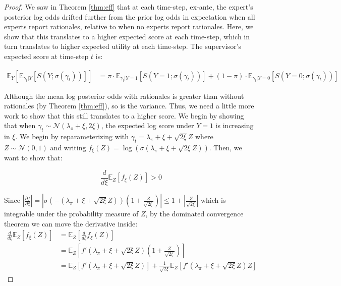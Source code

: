 \documentclass{winnower}
\begin{document}
\begin{proof} We saw in Theorem \ref{thm:eff} that at each time-step, ex-ante, the expert's posterior log odds drifted further from the prior log odds in expectation when all experts report rationales, relative to when no experts report rationales. Here, we show that this translates to a higher expected score at each time-step, which in turn translates to higher expected utility at each time-step. The supervisor's expected score at time-step $t$ is:

\begin{equation}
    \begin{split}
        \mathds{E}_Y\left[\mathds{E}_{\gamma_t|Y}\left[S\left(Y; \sigma\left(\gamma_t\right)\right) \right]\right] &= \pi \cdot \mathds{E}_{\gamma_t|Y=1}\left[S\left(Y=1; \sigma\left(\gamma_t\right)\right) \right] + (1-\pi) \cdot \mathds{E}_{\gamma_t|Y=0}\left[S\left(Y=0; \sigma\left(\gamma_t\right)\right) \right]
    \end{split}
\end{equation}

Although the mean log posterior odds with rationales is greater than without rationales (by Theorem \ref{thm:eff}), so is the variance. Thus, we need a little more work to show that this still translates to a higher score.  We begin by showing that when $\gamma_t \sim \mathcal{N}(\lambda_\pi + {\xi, 2\xi})$, the expected log score under $Y=1$ is increasing in $\xi$. We begin by reparameterizing with $\gamma_t = \lambda_\pi +  \xi + \sqrt{2\xi}Z$ where $Z \sim \mathcal{N}(0, 1)$ and writing $f_\xi(Z) = \log\left(\sigma\left(\lambda_\pi + \xi + \sqrt{2\xi}Z\right)\right)$. Then, we want to show that:

\begin{equation}
    \frac{d}{d\xi} \mathbb{E}_Z\left[f_\xi(Z)\right] > 0
\end{equation}

Since $\left|\frac{\partial f}{\partial \xi}\right| = \left|\sigma(-(\lambda_\pi + \xi + \sqrt{2\xi}Z))\left(1 + \frac{Z}{\sqrt{2\xi}}\right)\right| \leq 1 + \left|\frac{Z}{\sqrt{2\xi}}\right|$ which is integrable under the probability measure of $Z$, by the dominated convergence theorem we can move the derivative inside:
{\small
\begin{equation}
\begin{split}
    \frac{d}{d\xi} \mathbb{E}_Z\left[f_\xi(Z)\right] &=  \mathbb{E}_Z\left[\frac{d}{d\xi} f_\xi(Z)\right] \\
    &=  \mathbb{E}_Z\left[f'(\lambda_\pi + \xi + \sqrt{2\xi}Z) \left(1  +\frac{Z}{\sqrt{2\xi}}\right) \right] \\
    &=  \mathbb{E}_Z\left[f'(\lambda_\pi + \xi + \sqrt{2\xi}Z)\right] + \frac{1}{\sqrt{2\xi}}\mathbb{E}_Z\left[f'(\lambda_\pi + \xi + \sqrt{2\xi}Z) Z \right]
    \end{split}
\end{equation}
}


\end{proof}
\end{document}
